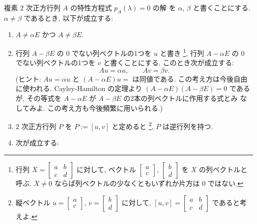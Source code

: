 \documentclass[12pt,twoside]{jarticle}
\begin{document}

\begin{question}[10点]
  \label{q:normal-form-2.1}
  複素 $2$ 次正方行列 $A$ の特性方程式 $p_A(\lambda)=0$ の解
  を $\alpha$, $\beta$ と書くことにする. 
  $\alpha \ne \beta$ であるとき, 以下が成立する:
  \begin{enumerate}
  \item[(1)] $A \ne \alpha E$ かつ $A \ne \beta E$.
  \item[(2)] 行列 $A - \beta E$ の $0$ でない列ベクトルの1つを $u$ と書き%
    \footnote{行列 $X=\begin{bmatrix}a&b\\c&d\end{bmatrix}$ に対して, 
      ベクトル $\begin{bmatrix}a\\c\end{bmatrix}$,
      $\begin{bmatrix}b\\d\end{bmatrix}$ を $X$ の列ベクトルと呼ぶ.
      $X \ne 0$ ならば列ベクトルの少なくともいずれか片方は $0$ ではない.}, %
    行列 $A - \alpha E$ の $0$ でない列ベクトルの1つを $v$ と書くことにする. 
    このとき次が成立する:
    \begin{equation*}
      Au = \alpha u,  \qquad  Av = \beta v.
    \end{equation*}
    (ヒント: $Au=\alpha u$ と $(A-\alpha E)u=$ は同値である.
    この考え方は今後自由に使われる. 
    Cayley-Hamilton の定理より $(A-\alpha E)(A-\beta E)=0$ であるが, 
    その等式を $A-\alpha E$ が $A-\beta E$ の2本の列ベクトルに作用する式とみ
    なしてみよ.  この考え方も今後頻繁に用いられる.)
  \item[(3)] $2$ 次正方行列 $P$ を $P := [u, v]$ と定めると%
    \footnote{縦ベクトル $u=\begin{bmatrix}a\\c\end{bmatrix}$, 
      $v=\begin{bmatrix}b\\d\end{bmatrix}$ に対して, 
      $[u, v] = \begin{bmatrix}a&b\\c&d\end{bmatrix}$ であると考えよ.}, %
    $P$ は逆行列を持つ. 
  \item[(4)] 次が成立する:
    \begin{equation*}

\end{equation*}
\end{enumerate}
\end{question}
\end{document}
